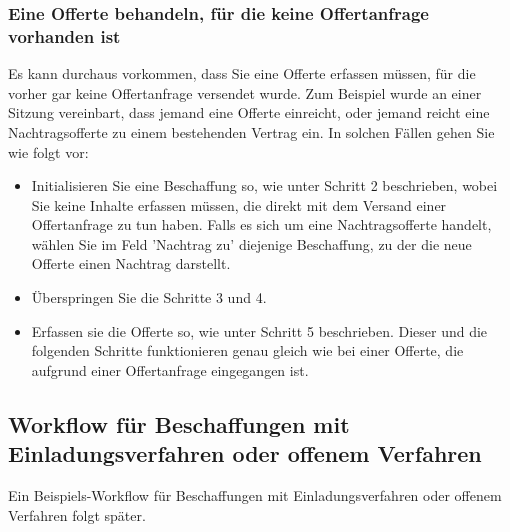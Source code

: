 \subsubsection{Eine Offerte behandeln, für die keine Offertanfrage vorhanden ist}

Es kann durchaus vorkommen, dass Sie eine Offerte erfassen müssen, für die vorher gar keine Offertanfrage versendet wurde. Zum Beispiel wurde an einer Sitzung vereinbart, dass jemand eine Offerte einreicht, oder jemand reicht eine Nachtragsofferte zu einem bestehenden Vertrag ein. In solchen Fällen gehen Sie wie folgt vor:


\begin{itemize}
\item
Initialisieren Sie eine Beschaffung so, wie unter Schritt 2 beschrieben, wobei Sie keine Inhalte erfassen müssen, die direkt mit dem Versand einer Offertanfrage zu tun haben. Falls es sich um eine Nachtragsofferte handelt, wählen Sie im Feld 'Nachtrag zu' diejenige Beschaffung, zu der die neue Offerte einen Nachtrag darstellt.
\item
Überspringen Sie die Schritte 3 und 4.
\item
Erfassen sie die Offerte so, wie unter Schritt 5 beschrieben. Dieser und die folgenden Schritte funktionieren genau gleich wie bei einer Offerte, die aufgrund einer Offertanfrage eingegangen ist.
\end{itemize}

\subsection{Workflow für Beschaffungen mit Einladungsverfahren oder offenem Verfahren}

Ein Beispiels-Workflow für Beschaffungen mit Einladungsverfahren oder offenem Verfahren folgt später.

